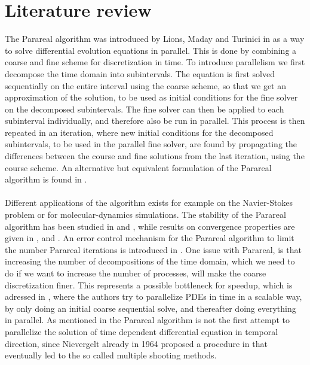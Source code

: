 \chapter{Literature review}
The Parareal algorithm was introduced by Lions, Maday and Turinici in \cite{lions2001resolution} as a way to solve differential evolution equations in parallel. This is done by combining a coarse and fine scheme for discretization in time. To introduce parallelism we first decompose the time domain into subintervals. The equation is first solved sequentially on the entire interval using the coarse scheme, so that we get an approximation of the solution, to be used as initial conditions for the fine solver on the decomposed subintervals. The fine solver can then be applied to each subinterval individually, and therefore also be run in parallel. This process is then repeated in an iteration, where new initial conditions for the decomposed subintervals, to be used in the parallel fine solver, are found by propagating the differences between the course and fine solutions from the last iteration, using the course scheme. An alternative but equivalent formulation of the Parareal algorithm is found in \cite{baffico2002parallel}. 
\\
\\
Different applications of the algorithm exists for example on the Navier-Stokes problem\cite{fischer2005parareal} or for molecular-dynamics simulations\cite{baffico2002parallel}. The stability of the Parareal algorithm has been studied in \cite{staff2005stability} and \cite{bal2005convergence}, while results on convergence properties are given in \cite{lions2001resolution},\cite{bal2005convergence} and \cite{gander2007superlinear}. An error control mechanism for the Parareal algorithm to limit the number Parareal iterations is introduced in \cite{lepsa2010efficient}. One issue with Parareal, is that increasing the number of decompositions of the time domain, which we need to do if we want to increase the number of processes, will make the coarse discretization finer. This represents a possible bottleneck for speedup, which is adressed in \cite{rao2014adjoint}, where the authors try to parallelize PDEs in time in a scalable way, by only doing an initial coarse sequential solve, and thereafter doing everything in parallel. As mentioned in \cite{gander2007superlinear} the Parareal algorithm is not the first attempt to parallelize the solution of time dependent differential equation in temporal direction, since Nievergelt already in 1964 proposed a procedure in \cite{nievergelt1964parallel} that eventually led to the so called multiple shooting methods.
